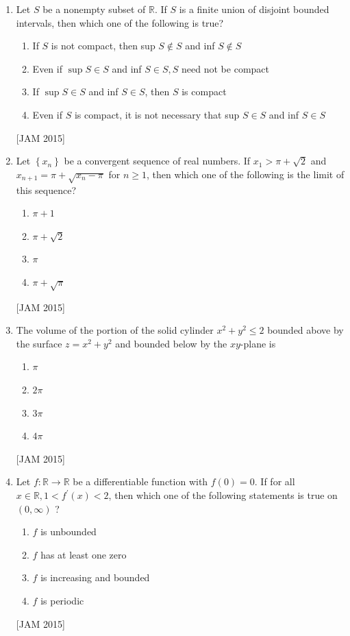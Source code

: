 \begin{enumerate}
\item  Let $S$ be a nonempty subset of $\mathbb{R}$. If $S$ is a finite union of disjoint bounded intervals, then which one of the following is true? 
\begin{enumerate}
    
\item If $S$ is not compact, then sup $S \notin S$ and inf $S \notin S$ 
\item Even if $\sup S \in S$ and inf $S \in S, S$ need not be compact 
\item If $\sup S \in S$ and inf $S \in S$, then $S$ is compact 
\item Even if $S$ is compact, it is not necessary that sup $S \in S$ and inf $S \in S$
\end{enumerate}
\hfill [JAM 2015]




\item  Let $\left\{x_{n}\right\}$ be a convergent sequence of real numbers. If $x_{1}>\pi+\sqrt{2}$ and $x_{n+1}=\pi+\sqrt{x_{n}-\pi}$ for $n \geq 1$, then which one of the following is the limit of this sequence? 
\begin{enumerate}
    \item $\pi+1$ 
\item $\pi+\sqrt{2}$ 
\item $\pi$ 
\item $\pi+\sqrt{\pi}$
\end{enumerate}
\hfill [JAM 2015]





\item  The volume of the portion of the solid cylinder $x^{2}+y^{2} \leq 2$ bounded above by the surface $z=x^{2}+y^{2}$ and bounded below by the $x y$-plane is 
\begin{enumerate}
    \item $\pi$ 
\item $2 \pi$ 
\item $3 \pi$ 
\item $4 \pi$
\end{enumerate}
\hfill [JAM 2015]





\item  Let $f: \mathbb{R} \rightarrow \mathbb{R}$ be a differentiable function with $f(0)=0$. If for all $x \in \mathbb{R}, 1<f^{\prime}(x)<2$, then which one of the following statements is true on $(0, \infty)$ ? 
\begin{enumerate}
    \item $f$ is unbounded 
\item $f$ has at least one zero 
\item $f$ is increasing and bounded 
\item $f$ is periodic
\end{enumerate}
\hfill [JAM 2015]






\end{enumerate}
